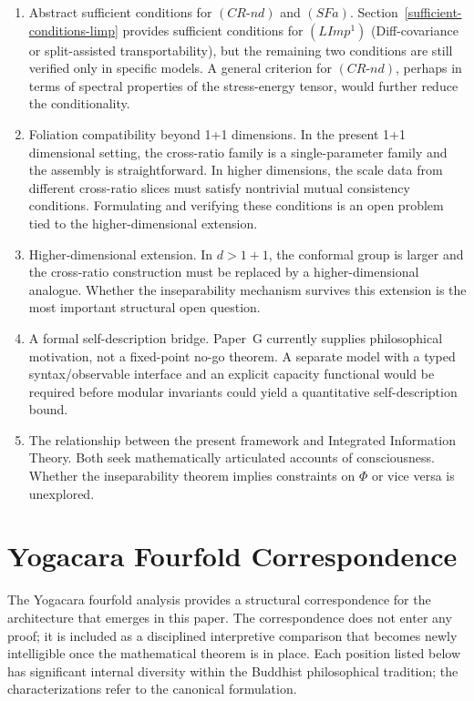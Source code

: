 \documentclass[12pt]{article}
\theoremstyle{definition}
\theoremstyle{remark}
\begin{document}
\begin{enumerate}
\def\labelenumi{\arabic{enumi}.}
\item
  Abstract sufficient conditions for \((CR\text{-}nd)\)
  and \((SFa)\). Section~\ref{sufficient-conditions-limp} provides sufficient conditions for \((LImp^1)\) (Diff-covariance or split-assisted transportability), but the remaining two conditions are still verified only in specific models. A general criterion for \((CR\text{-}nd)\), perhaps in terms of spectral properties of the stress-energy tensor, would further reduce the conditionality.
\item
  Foliation compatibility beyond 1+1 dimensions. In the present 1+1
  dimensional setting, the cross-ratio family is a single-parameter
  family and the assembly is straightforward. In higher dimensions, the
  scale data from different cross-ratio slices must satisfy nontrivial
  mutual consistency conditions. Formulating and verifying these
  conditions is an open problem tied to the higher-dimensional
  extension.
\item
  Higher-dimensional extension. In \(d > 1+1\), the conformal group is
  larger and the cross-ratio construction must be replaced by a
  higher-dimensional analogue. Whether the inseparability mechanism
  survives this extension is the most important structural open
  question.
\item
  A formal self-description bridge. Paper~G currently supplies
  philosophical motivation, not a fixed-point no-go theorem. A separate
  model with a typed syntax/observable interface and an explicit
  capacity functional would be required before modular invariants could
  yield a quantitative self-description bound.
\item
  The relationship between the present framework and Integrated
  Information Theory. Both seek mathematically articulated accounts of
  consciousness. Whether the inseparability theorem implies constraints
  on \(\Phi\) or vice versa is unexplored.
\end{enumerate}

\appendix

\section{Yogacara Fourfold Correspondence}\label{app:yogacara}

The Yogacara fourfold analysis provides a structural correspondence for
the architecture that emerges in this paper. The correspondence does not
enter any proof; it is included as a disciplined interpretive comparison
that becomes newly intelligible once the mathematical theorem is in
place. Each position listed below has significant internal diversity
within the Buddhist philosophical tradition; the characterizations refer
to the canonical formulation.
\end{document}
